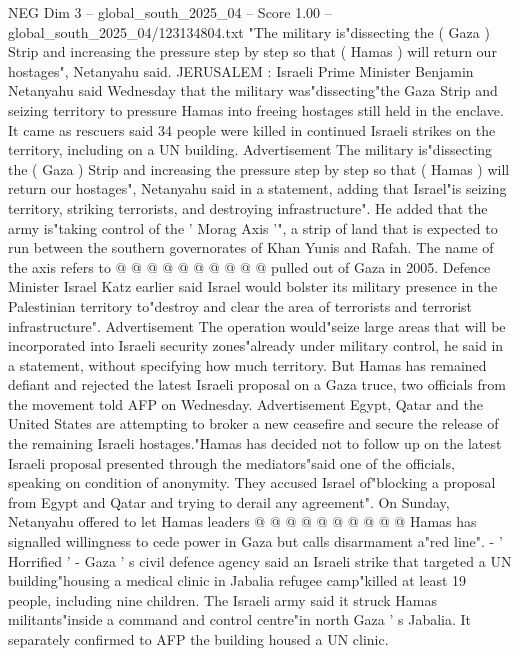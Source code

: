 \begin{textsample}{NEG Dim 3 – global\_south\_2025\_04 – Score 1.00 – global\_south\_2025\_04/123134804.txt}  \label{ex:f3_neg_343}
"The military is"dissecting the ( Gaza ) Strip and increasing the pressure step by step so that ( Hamas ) will return our hostages", Netanyahu said.
JERUSALEM : Israeli Prime Minister Benjamin Netanyahu said Wednesday that the military was"dissecting"the Gaza Strip and seizing territory to pressure Hamas into freeing hostages still held in the enclave.
It came as rescuers said 34 people were killed in continued Israeli strikes on the territory, including on a UN building.
Advertisement The military is"dissecting the ( Gaza ) Strip and increasing the pressure step by step so that ( Hamas ) will return our hostages", Netanyahu said in a statement, adding that Israel"is seizing territory, striking terrorists, and destroying infrastructure".
He added that the army is"taking control of the ' Morag Axis '", a strip of land that is expected to run between the southern governorates of Khan Yunis and Rafah.
The name of the axis refers to @ @ @ @ @ @ @ @ @ @ pulled out of Gaza in 2005.
Defence Minister Israel Katz earlier said Israel would bolster its military presence in the Palestinian territory to"destroy and clear the area of terrorists and terrorist infrastructure".
Advertisement The operation would"seize large areas that will be incorporated into Israeli security zones"already under military control, he said in a statement, without specifying how much territory.
But Hamas has remained defiant and rejected the latest Israeli proposal on a Gaza truce, two officials from the movement told AFP on Wednesday.
Advertisement Egypt, Qatar and the United States are attempting to broker a new ceasefire and secure the release of the remaining Israeli hostages."Hamas has decided not to follow up on the latest Israeli proposal presented through the mediators"said one of the officials, speaking on condition of anonymity.
They accused Israel of"blocking a proposal from Egypt and Qatar and trying to derail any agreement".
On Sunday, Netanyahu offered to let Hamas leaders @ @ @ @ @ @ @ @ @ @ Hamas has signalled willingness to cede power in Gaza but calls disarmament a"red line". - ' Horrified ' - Gaza ' s civil defence agency said an Israeli strike that targeted a UN building"housing a medical clinic in Jabalia refugee camp"killed at least 19 people, including nine children.
The Israeli army said it struck Hamas militants"inside a command and control centre"in north Gaza ' s Jabalia.
It separately confirmed to AFP the building housed a UN clinic.

\end{textsample}
